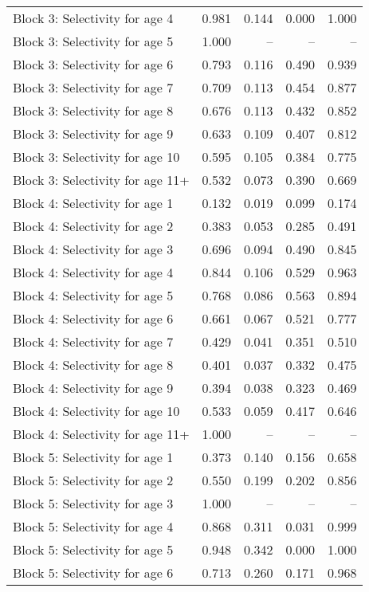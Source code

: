 \documentclass[
]{article}
\begin{document}
\begin{landscape}
\begin{longtable}[t]{lrrrr}
\addlinespace
Block 3: Selectivity for age 4 & 0.981 & 0.144 & 0.000 & 1.000\\
Block 3: Selectivity for age 5 & 1.000 & -- & -- & --\\
Block 3: Selectivity for age 6 & 0.793 & 0.116 & 0.490 & 0.939\\
Block 3: Selectivity for age 7 & 0.709 & 0.113 & 0.454 & 0.877\\
Block 3: Selectivity for age 8 & 0.676 & 0.113 & 0.432 & 0.852\\
\addlinespace
Block 3: Selectivity for age 9 & 0.633 & 0.109 & 0.407 & 0.812\\
Block 3: Selectivity for age 10 & 0.595 & 0.105 & 0.384 & 0.775\\
Block 3: Selectivity for age 11+ & 0.532 & 0.073 & 0.390 & 0.669\\
Block 4: Selectivity for age 1 & 0.132 & 0.019 & 0.099 & 0.174\\
Block 4: Selectivity for age 2 & 0.383 & 0.053 & 0.285 & 0.491\\
\addlinespace
Block 4: Selectivity for age 3 & 0.696 & 0.094 & 0.490 & 0.845\\
Block 4: Selectivity for age 4 & 0.844 & 0.106 & 0.529 & 0.963\\
Block 4: Selectivity for age 5 & 0.768 & 0.086 & 0.563 & 0.894\\
Block 4: Selectivity for age 6 & 0.661 & 0.067 & 0.521 & 0.777\\
Block 4: Selectivity for age 7 & 0.429 & 0.041 & 0.351 & 0.510\\
\addlinespace
Block 4: Selectivity for age 8 & 0.401 & 0.037 & 0.332 & 0.475\\
Block 4: Selectivity for age 9 & 0.394 & 0.038 & 0.323 & 0.469\\
Block 4: Selectivity for age 10 & 0.533 & 0.059 & 0.417 & 0.646\\
Block 4: Selectivity for age 11+ & 1.000 & -- & -- & --\\
Block 5: Selectivity for age 1 & 0.373 & 0.140 & 0.156 & 0.658\\
\addlinespace
Block 5: Selectivity for age 2 & 0.550 & 0.199 & 0.202 & 0.856\\
Block 5: Selectivity for age 3 & 1.000 & -- & -- & --\\
Block 5: Selectivity for age 4 & 0.868 & 0.311 & 0.031 & 0.999\\
Block 5: Selectivity for age 5 & 0.948 & 0.342 & 0.000 & 1.000\\
Block 5: Selectivity for age 6 & 0.713 & 0.260 & 0.171 & 0.968\\

\end{longtable}
\end{landscape}
\end{document}
